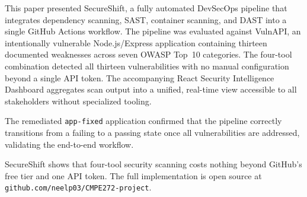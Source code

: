 \documentclass[10pt,conference]{IEEEtran}
\begin{document}
This paper presented SecureShift, a fully automated DevSecOps pipeline that
integrates dependency scanning, SAST, container scanning, and DAST into a
single GitHub Actions workflow.
The pipeline was evaluated against VulnAPI, an intentionally vulnerable
Node.js/Express application containing thirteen documented weaknesses across
seven OWASP Top~10 categories.
The four-tool combination detected all thirteen vulnerabilities with no manual
configuration beyond a single API token.
The accompanying React Security Intelligence Dashboard aggregates scan output
into a unified, real-time view accessible to all stakeholders without
specialized tooling.

The remediated \texttt{app-fixed} application confirmed that the pipeline
correctly transitions from a failing to a passing state once all vulnerabilities
are addressed, validating the end-to-end workflow.

SecureShift shows that four-tool security scanning costs nothing beyond
GitHub's free tier and one API token.
The full implementation is open source at
\texttt{github.com/neelp03/CMPE272-project}.
\end{document}
